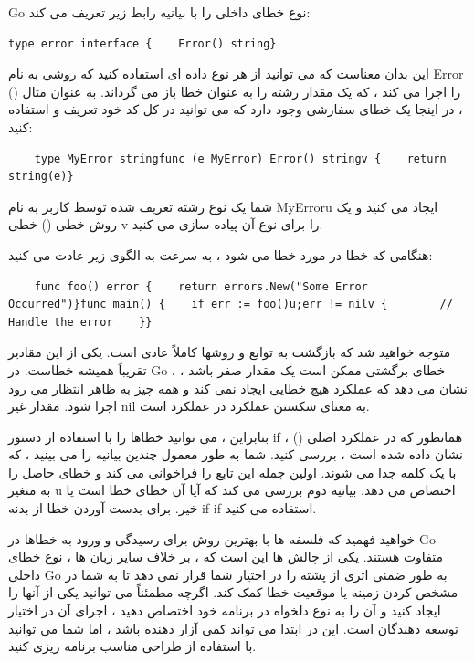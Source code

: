 \documentclass[12pt]{book}
\begin{document}
Go نوع خطای داخلی را با بیانیه رابط زیر تعریف می کند:
\begin{latin}
	\begin{lstlisting}
type error interface {    Error() string}
	\end{lstlisting}
\end{latin}

این بدان معناست که می توانید از هر نوع داده ای استفاده کنید که روشی به نام Error () را اجرا می کند ، که یک مقدار رشته را به عنوان خطا باز می گرداند. به عنوان مثال ، در اینجا یک خطای سفارشی وجود دارد که می توانید در کل کد خود تعریف و استفاده کنید:
\begin{latin}
	\begin{lstlisting}
	type MyError stringfunc (e MyError) Error() stringv {    return string(e)}
	\end{lstlisting}
\end{latin}

شما یک نوع رشته تعریف شده توسط کاربر به نام MyErroru ایجاد می کنید و یک روش خطی () خطی v را برای نوع آن پیاده سازی می کنید.

هنگامی که خطا در مورد خطا می شود ، به سرعت به الگوی زیر عادت می کنید:
\begin{latin}
	\begin{lstlisting}
	func foo() error {    return errors.New("Some Error Occurred")}func main() {    if err := foo()u;err != nilv {        // Handle the error    }}
	\end{lstlisting}
\end{latin}

متوجه خواهید شد که بازگشت به توابع و روشها کاملاً عادی است. یکی از این مقادیر تقریباً همیشه خطاست. در Go ، خطای برگشتی ممکن است یک مقدار صفر باشد ، نشان می دهد که عملکرد هیچ خطایی ایجاد نمی کند و همه چیز به ظاهر انتظار می رود اجرا شود. مقدار غیر nil به معنای شکستن عملکرد در عملکرد است.

بنابراین ، می توانید خطاها را با استفاده از دستور if ، همانطور که در عملکرد اصلی () نشان داده شده است ، بررسی کنید. شما به طور معمول چندین بیانیه را می بینید ، که با یک کلمه جدا می شوند. اولین جمله این تابع را فراخوانی می کند و خطای حاصل را به متغیر u اختصاص می دهد. بیانیه دوم بررسی می کند که آیا آن خطای خطا است یا خیر. برای بدست آوردن خطا از بدنه if if استفاده می کنید.

خواهید فهمید که فلسفه ها با بهترین روش برای رسیدگی و ورود به خطاها در Go متفاوت هستند. یکی از چالش ها این است که ، بر خلاف سایر زبان ها ، نوع خطای داخلی Go به طور ضمنی اثری از پشته را در اختیار شما قرار نمی دهد تا به شما در مشخص کردن زمینه یا موقعیت خطا کمک کند. اگرچه مطمئناً می توانید یکی از آنها را ایجاد کنید و آن را به نوع دلخواه در برنامه خود اختصاص دهید ، اجرای آن در اختیار توسعه دهندگان است. این در ابتدا می تواند کمی آزار دهنده باشد ، اما شما می توانید با استفاده از طراحی مناسب برنامه ریزی کنید.
\end{document}
